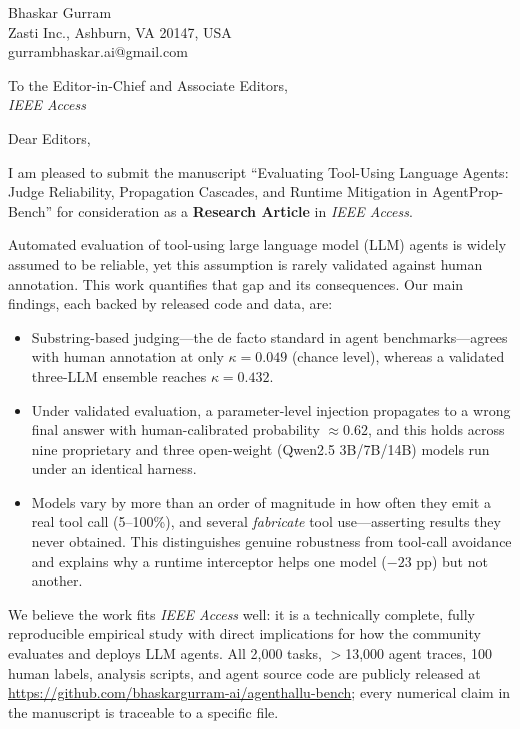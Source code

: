 \documentclass[11pt]{article}
\begin{document}
\thispagestyle{empty}

\noindent Bhaskar Gurram\\
Zasti Inc., Ashburn, VA 20147, USA\\
gurrambhaskar.ai@gmail.com

\vspace{1em}
\noindent To the Editor-in-Chief and Associate Editors,\\
\textit{IEEE Access}

\vspace{1em}
\noindent Dear Editors,

\vspace{0.5em}
I am pleased to submit the manuscript ``Evaluating Tool-Using Language Agents:
Judge Reliability, Propagation Cascades, and Runtime Mitigation in
AgentProp-Bench'' for consideration as a \textbf{Research Article} in
\emph{IEEE Access}.

Automated evaluation of tool-using large language model (LLM) agents is widely
assumed to be reliable, yet this assumption is rarely validated against human
annotation. This work quantifies that gap and its consequences. Our main
findings, each backed by released code and data, are:

\begin{itemize}
  \item Substring-based judging---the de facto standard in agent
  benchmarks---agrees with human annotation at only $\kappa = 0.049$
  (chance level), whereas a validated three-LLM ensemble reaches
  $\kappa = 0.432$.
  \item Under validated evaluation, a parameter-level injection propagates to a
  wrong final answer with human-calibrated probability $\approx 0.62$, and this
  holds across nine proprietary and three open-weight (Qwen2.5 3B/7B/14B)
  models run under an identical harness.
  \item Models vary by more than an order of magnitude in how often they emit a
  real tool call (5--100\%), and several \emph{fabricate} tool use---asserting
  results they never obtained. This distinguishes genuine robustness from
  tool-call avoidance and explains why a runtime interceptor helps one model
  ($-23$ pp) but not another.
\end{itemize}

We believe the work fits \emph{IEEE Access} well: it is a technically complete,
fully reproducible empirical study with direct implications for how the
community evaluates and deploys LLM agents. All 2{,}000 tasks, $>$13{,}000
agent traces, 100 human labels, analysis scripts, and agent source code are
publicly released at \url{https://github.com/bhaskargurram-ai/agenthallu-bench};
every numerical claim in the manuscript is traceable to a specific file.
\end{document}
